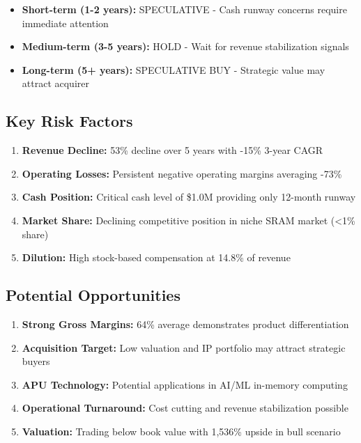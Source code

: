 \documentclass[11pt,a4paper]{article}
\begin{document}
\begin{itemize}
\itemsep0.3em
\item \textbf{Short-term (1-2 years):} SPECULATIVE - Cash runway concerns require immediate attention
\item \textbf{Medium-term (3-5 years):} HOLD - Wait for revenue stabilization signals
\item \textbf{Long-term (5+ years):} SPECULATIVE BUY - Strategic value may attract acquirer
\end{itemize}

\vspace{0.3cm}

\subsection{Key Risk Factors}

\begin{enumerate}
\itemsep0.3em
\item \textbf{Revenue Decline:} 53\% decline over 5 years with -15\% 3-year CAGR
\item \textbf{Operating Losses:} Persistent negative operating margins averaging -73\%
\item \textbf{Cash Position:} Critical cash level of \$1.0M providing only 12-month runway
\item \textbf{Market Share:} Declining competitive position in niche SRAM market (<1\% share)
\item \textbf{Dilution:} High stock-based compensation at 14.8\% of revenue
\end{enumerate}

\vspace{0.3cm}

\subsection{Potential Opportunities}

\begin{enumerate}
\itemsep0.3em
\item \textbf{Strong Gross Margins:} 64\% average demonstrates product differentiation
\item \textbf{Acquisition Target:} Low valuation and IP portfolio may attract strategic buyers
\item \textbf{APU Technology:} Potential applications in AI/ML in-memory computing
\item \textbf{Operational Turnaround:} Cost cutting and revenue stabilization possible
\item \textbf{Valuation:} Trading below book value with 1,536\% upside in bull scenario
\end{enumerate}
\end{document}
